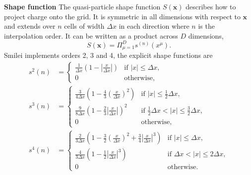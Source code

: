 \textbf{Shape function} The quasi-particle shape function $S(\mathbf{x})$ describes how to project charge onto the grid. It is symmetric in all dimensions with respect to $\mathbf{x}$ and extends over $n$ cells of width $\Delta x$ in each direction where $n$ is the interpolation order. It can be written as a product across $D$ dimensions,
\begin{equation}
	S(\mathbf{x}) = \Pi^D_{\mu = 1}s^{(n)}(x^\mu).
\end{equation}
Smilei implements orders 2, 3 and 4, the explicit shape functions are
\begin{subequations}
	\begin{align}
	s^2 (n) &= \begin{cases}
		\frac{1}{\Delta x}\left(1-\left|\frac{x}{\Delta x}\right| \right)  & \text{if } |x| \le \Delta x, \\
		0  & \text{otherwise,}
	\end{cases} \\
	s^3(n) &= \begin{cases}
		\frac{3}{4\Delta x}\left(1-\frac{4}{3}\left(\frac{x}{\Delta x}\right)^2 \right)  & \text{if } |x| \le \frac{1}{2}\Delta x, \\
		\frac{9}{8\Delta x}\left(1-\frac{2}{3}\left|\frac{x}{\Delta x}\right| \right)^2  & \text{if } \frac{1}{2}\Delta x <|x| \le \frac{3}{2} \Delta x, \\
		0  & \text{otherwise,}
	\end{cases}  \\
		s^4(n) &= \begin{cases}
		\frac{2}{3 \Delta x}\left( 1-\frac{3}{2}\left(\frac{x}{\Delta x}\right)^2 + \frac{3}{4}\left| \frac{x}{\Delta x}\right| ^3 \right)  & \text{if } |x| \le \Delta x, \\
		\frac{4}{3 \Delta x}\left(1-\frac{1}{2}\left|\frac{x}{\Delta x}\right| ^3 \right)  & \text{if } \Delta x <|x| \le 2\Delta x, \\
		0  & \text{otherwise.}
	\end{cases} 
	\end{align}
\end{subequations}


